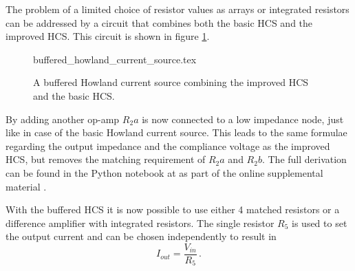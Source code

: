 The problem of a limited choice of resistor values as arrays or integrated resistors can be addressed by a circuit that combines both the basic HCS and the improved HCS. This circuit is shown in figure \ref{fig:buffered_howland_current_source}.
\begin{figure}[hb]
    \centering
        {buffered_howland_current_source.tex}
    \caption{A buffered Howland current source combining the improved HCS and the basic HCS.}
    \label{fig:buffered_howland_current_source}
\end{figure}

By adding another op-amp $R_2a$ is now connected to a low impedance node, just like in case of the basic Howland current source. This leads to the same formulae regarding the output impedance and the compliance voltage as the improved HCS, but removes the matching requirement of $R_2a$ and $R_2b$. The full derivation can be found in the Python notebook at  as part of the online supplemental material \cite{supplemental_material}.

With the buffered HCS it is now possible to use either \num{4} matched resistors or a difference amplifier with integrated resistors. The single resistor $R_5$ is used to set the output current and can be chosen independently to result in
\begin{equation}
    I_{out} = \frac{V_{in}}{R_5}\,.
\end{equation}

